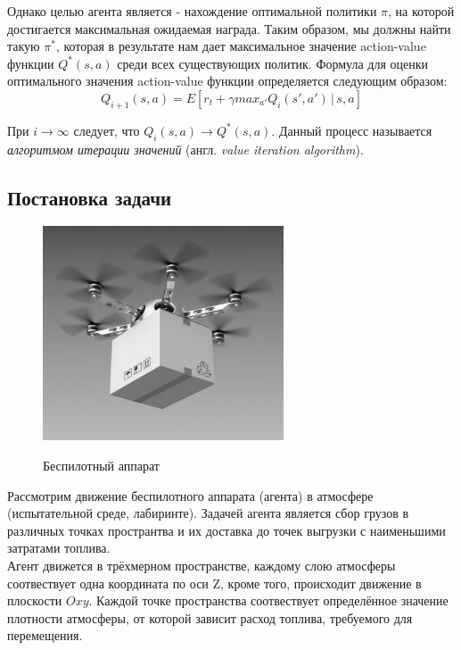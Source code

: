 \documentclass[a4paper]{report}
\theoremstyle{definition}
\theoremstyle{plain}
\theoremstyle{remark}
\theoremstyle{remark}
\theoremstyle{definition}
\begin{document}
Однако целью агента является - нахождение оптимальной политики $\pi$, на которой достигается максимальная ожидаемая награда. Таким образом, мы должны найти такую $\pi^*$, которая в результате нам дает максимальное значение action-value функции $Q^*(s, a)$ среди всех существующих политик. Формула для оценки оптимального значения action-value функции определяется следующим образом:
$$Q_{i+1}(s, a) = E[r_t + \gamma max_{a'}Q_i(s', a')\,|\,s, a]$$

При $i \rightarrow \infty$ следует, что $Q_{i}(s, a) \rightarrow Q^*(s, a)$. Данный процесс называется \textit{алгоритмом итерации значений} (англ. \textit{value iteration algorithm}).

\newpage
\begin{center}
\section{Постановка задачи}
\end{center}

\begin{figure}[H]
	{\includegraphics[scale = 0.6]{dronebw.jpg}}
	\caption{Беспилотный аппарат}
\end{figure}

Рассмотрим движение беспилотного аппарата (агента) в атмосфере (испытательной среде, лабиринте). Задачей агента является сбор грузов в различных точках пространтва и их доставка до точек выгрузки с наименьшими затратами топлива.\\

Агент движется в трёхмерном пространстве, каждому слою атмосферы соотвествует одна координата по оси Z, кроме того, происходит движение в плоскости $Oxy$. Каждой точке пространства соотвествует определённое значение плотности атмосферы, от которой зависит расход топлива, требуемого для перемещения.\\
\end{document}

